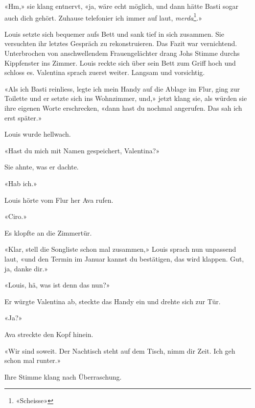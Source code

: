 «Hm,» sie klang entnervt, «ja, wäre echt möglich, und dann hätte Basti
sogar auch dich gehört. Zuhause telefonier ich immer auf laut,
\emph{merda}\footnote{«Scheisse»}.»

Louis setzte sich bequemer aufs Bett und sank tief in sich zusammen. Sie
versuchten ihr letztes Gespräch zu rekonstruieren. Das Fazit war
vernichtend. Unterbrochen von anschwellendem Frauengelächter drang Johs Stimme durchs
Kippfenster ins Zimmer. Louis reckte sich über sein Bett zum Griff hoch
und schloss es.
Valentina sprach zuerst weiter. Langsam und vorsichtig.

«Als ich Basti reinliess, legte ich mein Handy auf die Ablage im Flur,
ging zur Toilette und er setzte sich ins Wohnzimmer, und,» jetzt klang
sie, als würden sie ihre eigenen Worte erschrecken, «dann hast du
nochmal angerufen. Das sah ich erst später.»

Louis wurde hellwach.

«Hast du mich mit Namen gespeichert, Valentina?»

Sie ahnte, was er dachte.

«Hab ich.»

Louis hörte vom Flur her Ava rufen.

«Ciro.»

Es klopfte an die Zimmertür.

«Klar, stell die Songliste schon mal zusammen,» Louis sprach nun
unpassend laut, «und den Termin im Januar kannst du bestätigen, das wird
klappen. Gut, ja, danke dir.»

«Louis, hä, was ist denn das nun?»

Er würgte Valentina ab, steckte das Handy ein und drehte sich zur Tür.

«Ja?»

Ava streckte den Kopf hinein.

«Wir sind soweit. Der Nachtisch steht auf dem Tisch, nimm dir Zeit. Ich
geh schon mal runter.»

Ihre Stimme klang nach Überraschung.
